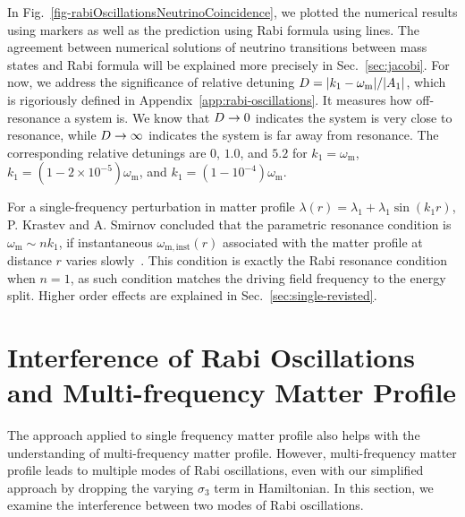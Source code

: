 In Fig.~\ref{fig-rabiOscillationsNeutrinoCoincidence}, we plotted the numerical results using markers as well as the prediction using Rabi formula using lines. The agreement between numerical solutions of neutrino transitions between mass states and Rabi formula will be explained more precisely in Sec.~\ref{sec:jacobi}. For now, we address the significance of relative detuning $D = \lvert k_1 - \omega_{\mathrm m} \rvert /\lvert A_1 \rvert$,  which is rigoriously defined in Appendix~\ref{app:rabi-oscillations}. It measures how off-resonance a system is. We know that $D\to 0$ indicates the system is very close to resonance, while $D\to \infty$ indicates the system is far away from resonance. The corresponding relative detunings are $0$, $1.0$, and $5.2$ for $k_1=\omega_{\mathrm{m}}$, $k_1=(1-2\times 10^{-5})\omega_{\mathrm m}$, and $k_1=(1-10^{-4})\omega_{\mathrm m}$.


For a single-frequency perturbation in matter profile $\lambda(r) =\lambda_1 +  \lambda_1\sin(k_1 r)$, P. Krastev and A. Smirnov concluded that the parametric resonance condition is $\omega_{\mathrm{m}} \sim n k_1$, if instantaneous $\omega_{\mathrm{m,inst}}(r)$ associated with the matter profile at distance $r$ varies slowly~\cite{Krastev1989}. This condition is exactly the Rabi resonance condition when $n=1$, as such condition matches the driving field frequency to the energy split. Higher order effects are explained in Sec.~\ref{sec:single-revisted}.





\section{\label{sec:multiple}Interference of Rabi Oscillations and Multi-frequency Matter Profile}


The approach applied to single frequency matter profile also helps with the understanding of multi-frequency matter profile. However, multi-frequency matter profile leads to multiple modes of Rabi oscillations, even with our simplified approach by dropping the varying $\sigma_3$ term in Hamiltonian. In this section, we examine the interference between two modes of Rabi oscillations.






